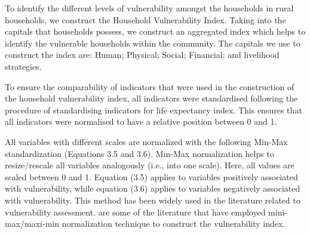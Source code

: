 To identify the different levels of vulnerability amongst the households in rural households, we construct the Household Vulnerability Index. Taking into the capitals that households possess, we construct an aggregated index which helps to identify the vulnerable households within the community. The capitals we use to construct the index are: Human; Physical; Social; Financial; and livelihood strategies.\par 

To ensure the comparability of indicators that were used in the construction of the
household vulnerability index, all indicators were standardised following the
\citep{watkins2007human} procedure of standardising indicators for life expectancy index. This
ensures that all indicators were normalised to have a relative position between 0 and 1. \par
All variables with different scales are normalized with the following Min-Max standardization 
(Equations 3.5 and 3.6). Min-Max normalization helps to resize/rescale all variables analogously 
(i.e., into one scale). Here, all values are scaled between 0 and 1. Equation (3.5) applies to 
variables positively associated with vulnerability, while 
equation (3.6) applies to variables negatively associated with vulnerability. This method has been widely used in the literature related to vulnerability assessment. \cite{fang2016rural, antwi2013characterising, karunarathne2020developing, huynh2018multi, dumenu2020social} are some of the literature that have employed mini-max/maxi-min normalization technique to construct the vulnerability index.\par

